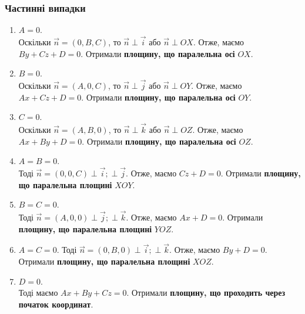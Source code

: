 \documentclass[a4paper, 10pt]{extarticle}
\theoremstyle{theoremdd}
\theoremstyle{theoremdd}
\theoremstyle{theoremdd}
\theoremstyle{theoremdd}
\theoremstyle{theoremdd}
\theoremstyle{theoremdd}
\theoremstyle{theoremdd}
\theoremstyle{theoremdd}
\begin{document}
\subsubsection*{Частинні випадки}
\begin{enumerate}[wide=0pt,label={\Roman*.}]
\item $A = 0$.\\
Оскільки $\vec{n} = (0,B,C)$, то $\vec{n} \perp \vec{i}$ або $\vec{n} \perp OX$. Отже, маємо $By + Cz + D = 0$. Отримали \textbf{площину, що паралельна осі} $OX$.

\item $B = 0$.\\
Оскільки $\vec{n} = (A,0,C)$, то $\vec{n} \perp \vec{j}$ або $\vec{n} \perp OY$. Отже, маємо $Ax + Cz + D = 0$. Отримали \textbf{площину, що паралельна осі} $OY$.

\item $C = 0$.\\
Оскільки $\vec{n} = (A,B,0)$, то $\vec{n} \perp \vec{k}$ або $\vec{n} \perp OZ$. Отже, маємо $Ax + By + D = 0$. Отримали \textbf{площину, що паралельна осі} $OZ$.

\item $A=B=0$.\\
Тоді $\vec{n} = (0,0,C) \perp \vec{i}; \perp \vec{j}$. Отже, маємо $Cz + D = 0$. Отримали \textbf{площину, що паралельна площині} $XOY$.

\item $B=C=0$.\\
Тоді $\vec{n} = (A,0,0) \perp \vec{j}; \perp \vec{k}$. Отже, маємо $Ax + D = 0$. Отримали \textbf{площину, що паралельна площині} $YOZ$.

\item $A=C=0$.
Тоді $\vec{n} = (0,B,0) \perp \vec{i}; \perp \vec{k}$. Отже, маємо $By + D = 0$. Отримали \textbf{площину, що паралельна площині} $XOZ$.

\item $D = 0$.\\
Тоді маємо $Ax + By + Cz = 0$. Отримали \textbf{площину, що проходить через початок координат}.
\end{enumerate}
\end{document}
